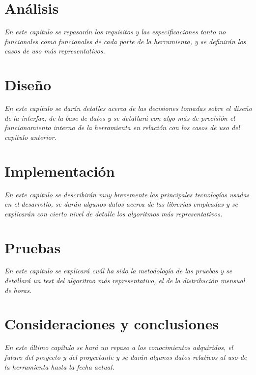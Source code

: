 \documentclass[a4paper,12pt]{book}
\begin{document}
\chapter{Análisis}
\label{chp:analisis}
\thispagestyle{empty}
\noindent \textit{En este capítulo se repasarán los requisitos y las
especificaciones tanto no funcionales como funcionales de cada parte de la
herramienta, y se definirán los casos de uso más representativos.}


\chapter{Diseño}
\label{chp:diseno}
\thispagestyle{empty}
\noindent \textit{En este capítulo se darán detalles acerca de las decisiones
tomadas sobre el diseño de la interfaz, de la base de datos y se detallará con
algo más de precisión el funcionamiento interno de la herramienta en relación
con los casos de uso del capítulo anterior.}


\chapter{Implementación}
\label{chp:implementacion}
\thispagestyle{empty}
\noindent \textit{En este capítulo se describirán muy brevemente las
principales tecnologías usadas en el desarrollo, se darán algunos datos
acerca de las librerías empleadas y se explicarán con cierto nivel de detalle
los algoritmos más representativos.}


\chapter{Pruebas}
\label{chp:pruebas}
\thispagestyle{empty}
\noindent \textit{En este capítulo se explicará cuál ha sido la metodología de
las pruebas y se detallará un test del algoritmo más representativo, el de la
distribución mensual de horas.}


\chapter{Consideraciones y conclusiones}
\label{chp:conclusiones}
\thispagestyle{empty}
\noindent \textit{En este último capítulo se hará un repaso a los
conocimientos adquiridos, el futuro del proyecto y del proyectante y se darán
algunos datos relativos al uso de la herramienta hasta la fecha actual.}

\end{document}
